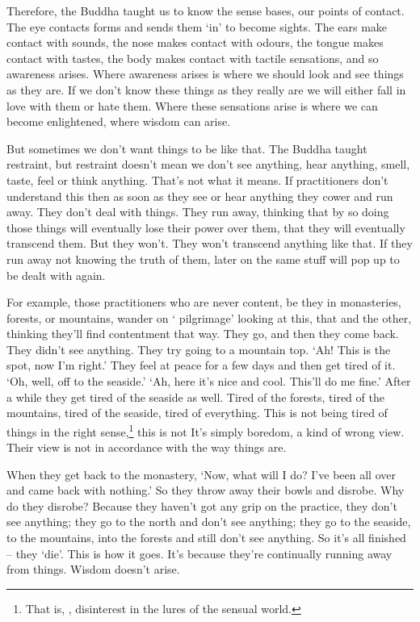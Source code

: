 Therefore, the Buddha taught us to know the sense bases, our points of contact. The eye contacts forms and sends them `in' to become sights. The ears make contact with sounds, the nose makes contact with odours, the tongue makes contact with tastes, the body makes contact with tactile sensations, and so awareness arises. Where awareness arises is where we should look and see things as they are. If we don't know these things as they really are we will either fall in love with them or hate them. Where these sensations arise is where we can become enlightened, where wisdom can arise. 

But sometimes we don't want things to be like that. The Buddha taught restraint, but restraint doesn't mean we don't see anything, hear anything, smell, taste, feel or think anything. That's not what it means. If practitioners don't understand this then as soon as they see or hear anything they cower and run away. They don't deal with things. They run away, thinking that by so doing those things will eventually lose their power over them, that they will eventually transcend them. But they won't. They won't transcend anything like that. If they run away not knowing the truth of them, later on the same stuff will pop up to be dealt with again. 

For example, those practitioners who are never content, be they in monasteries, forests, or mountains, wander on ` pilgrimage' looking at this, that and the other, thinking they'll find contentment that way. They go, and then they come back. They didn't see anything. They try going to a mountain top. `Ah! This is the spot, now I'm right.' They feel at peace for a few days and then get tired of it. `Oh, well, off to the seaside.' `Ah, here it's nice and cool. This'll do me fine.' After a while they get tired of the seaside as well. Tired of the forests, tired of the mountains, tired of the seaside, tired of everything. This is not being tired of things in the right sense,\footnote{That is, , disinterest in the lures of the sensual world.} this is not  It's simply boredom, a kind of wrong view. Their view is not in accordance with the way things are. 

When they get back to the monastery, `Now, what will I do? I've been all over and came back with nothing.' So they throw away their bowls and disrobe. Why do they disrobe? Because they haven't got any grip on the practice, they don't see anything; they go to the north and don't see anything; they go to the seaside, to the mountains, into the forests and still don't see anything. So it's all finished -- they `die'. This is how it goes. It's because they're continually running away from things. Wisdom doesn't arise. 

